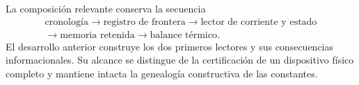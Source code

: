 La composición relevante conserva la secuencia
\[
 \begin{gathered}
 \text{cronología}\longrightarrow
 \text{registro de frontera}\longrightarrow
 \text{lector de corriente y estado}\\
 \longrightarrow
 \text{memoria retenida}\longrightarrow
 \text{balance térmico}.
 \end{gathered}
\]
El desarrollo anterior construye los dos primeros lectores y sus
consecuencias informacionales. Su alcance se distingue de la certificación
de un dispositivo físico completo y mantiene intacta la genealogía
constructiva de las constantes.
